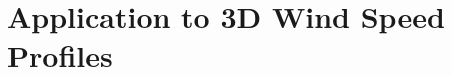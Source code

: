 \documentclass[12pt]{article}
\begin{document}


\section{Application to 3D Wind Speed Profiles}
\label{sec:realdataset}
\end{document}
